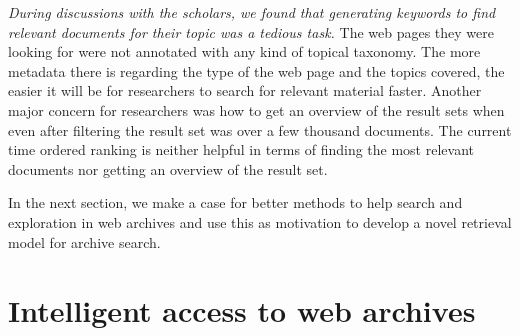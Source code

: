  \textit{During discussions with the scholars, we found that generating keywords to find relevant documents for their topic was a tedious task.} The web pages they were looking for were not annotated with any kind of topical taxonomy. The more metadata there is regarding the type of the web page and the topics covered, the easier it will be for researchers to search for relevant material faster. Another major concern for researchers was how to get an overview of the result sets when even after filtering the result set was over a few thousand documents. The current time ordered ranking is neither helpful in terms of finding the most relevant documents nor getting an overview of the result set.

In the next section, we make a case for better methods to help search and exploration in web archives and use this as motivation to develop a novel retrieval model for archive search.










\section{Intelligent access to web archives} %
\label{sec:intelligent_access_to_web_archives}

